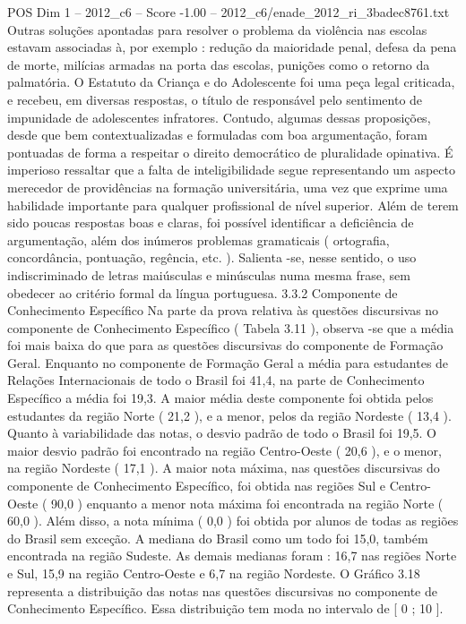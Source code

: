 \begin{textsample}{POS Dim 1 – 2012\_c6 – Score -1.00 – 2012\_c6/enade\_2012\_ri\_3badec8761.txt}
Outras soluções apontadas para resolver o problema da violência nas escolas estavam associadas à, por exemplo : redução da maioridade penal, defesa da pena de morte, milícias armadas na porta das escolas, punições como o retorno da palmatória.
O Estatuto da Criança e do Adolescente foi uma peça legal criticada, e recebeu, em diversas respostas, o título de responsável pelo sentimento de impunidade de adolescentes infratores.
Contudo, algumas dessas proposições, desde que bem contextualizadas e formuladas com boa argumentação, foram pontuadas de forma a respeitar o direito democrático de pluralidade opinativa.
É imperioso ressaltar que a falta de inteligibilidade segue representando um aspecto merecedor de providências na formação universitária, uma vez que exprime uma habilidade importante para qualquer profissional de nível superior.
Além de terem sido poucas respostas boas e claras, foi possível identificar a deficiência de argumentação, além dos inúmeros problemas gramaticais ( ortografia, concordância, pontuação, regência, etc. ).
Salienta -se, nesse sentido, o uso indiscriminado de letras maiúsculas e minúsculas numa mesma frase, sem obedecer ao critério formal da língua portuguesa. 3.3.2 Componente de Conhecimento Específico Na parte da prova relativa às questões discursivas no componente de Conhecimento Específico ( Tabela 3.11 ), observa -se que a média foi mais baixa do que para as questões discursivas do componente de Formação Geral.
Enquanto no componente de Formação Geral a média para estudantes de Relações Internacionais de todo o Brasil foi 41,4, na parte de Conhecimento Específico a média foi 19,3.
A maior média deste componente foi obtida pelos estudantes da região Norte ( 21,2 ), e a menor, pelos da região Nordeste ( 13,4 ).
Quanto à variabilidade das notas, o desvio padrão de todo o Brasil foi 19,5.
O maior desvio padrão foi encontrado na região Centro-Oeste ( 20,6 ), e o menor, na região Nordeste ( 17,1 ).
A maior nota máxima, nas questões discursivas do componente de Conhecimento Específico, foi obtida nas regiões Sul e Centro-Oeste ( 90,0 ) enquanto a menor nota máxima foi encontrada na região Norte ( 60,0 ).
Além disso, a nota mínima ( 0,0 ) foi obtida por alunos de todas as regiões do Brasil sem exceção.
A mediana do Brasil como um todo foi 15,0, também encontrada na região Sudeste.
As demais medianas foram : 16,7 nas regiões Norte e Sul, 15,9 na região Centro-Oeste e 6,7 na região Nordeste.
O Gráfico 3.18 representa a distribuição das notas nas questões discursivas no componente de Conhecimento Específico.
Essa distribuição tem moda no intervalo de [ 0 ; 10 ].

\end{textsample}
